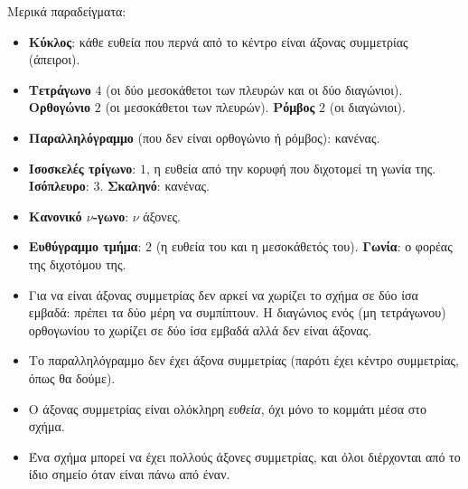 \begin{center}
\end{center}

Μερικά παραδείγματα:
\begin{itemize}[leftmargin=1.2em,itemsep=0.3ex,topsep=2pt]
\item \textbf{Κύκλος}: κάθε ευθεία που περνά από το κέντρο είναι άξονας συμμετρίας (άπειροι).
\item \textbf{Τετράγωνο} $4$ (οι δύο μεσοκάθετοι των πλευρών και οι δύο διαγώνιοι). \textbf{Ορθογώνιο} $2$ (οι μεσοκάθετοι των πλευρών). \textbf{Ρόμβος} $2$ (οι διαγώνιοι).
\item \textbf{Παραλληλόγραμμο} (που δεν είναι ορθογώνιο ή ρόμβος): κανένας.
\item \textbf{Ισοσκελές τρίγωνο}: $1$, η ευθεία από την κορυφή που διχοτομεί τη γωνία της. \textbf{Ισόπλευρο}: $3$. \textbf{Σκαληνό}: κανένας.
\item \textbf{Κανονικό $\nu$-γωνο}: $\nu$ άξονες.
\item \textbf{Ευθύγραμμο τμήμα}: $2$ (η ευθεία του και η μεσοκάθετός του). \textbf{Γωνία}: ο φορέας της διχοτόμου της.
\end{itemize}

\begin{prosoxi}
\begin{itemize}[leftmargin=1.2em,itemsep=0.3ex,topsep=2pt]
\item Για να είναι άξονας συμμετρίας δεν αρκεί να χωρίζει το σχήμα σε δύο ίσα εμβαδά: πρέπει τα δύο μέρη να συμπίπτουν. Η διαγώνιος ενός (μη τετράγωνου) ορθογωνίου το χωρίζει σε δύο ίσα εμβαδά αλλά δεν είναι άξονας.
\item Το παραλληλόγραμμο δεν έχει άξονα συμμετρίας (παρότι έχει κέντρο συμμετρίας, όπως θα δούμε).
\item Ο άξονας συμμετρίας είναι ολόκληρη \emph{ευθεία}, όχι μόνο το κομμάτι μέσα στο σχήμα.
\item Ένα σχήμα μπορεί να έχει πολλούς άξονες συμμετρίας, και όλοι διέρχονται από το ίδιο σημείο όταν είναι πάνω από έναν.
\end{itemize}
\end{prosoxi}

